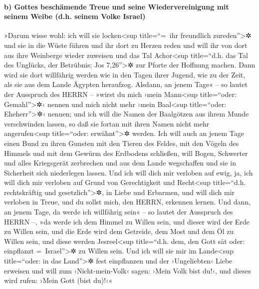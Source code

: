 \hypertarget{b-gottes-beschuxe4mende-treue-und-seine-wiedervereinigung-mit-seinem-weibe-d.h.-seinem-volke-israel}{%
\paragraph{b) Gottes beschämende Treue und seine Wiedervereinigung mit
seinem Weibe (d.h. seinem Volke
Israel)}\label{b-gottes-beschuxe4mende-treue-und-seine-wiedervereinigung-mit-seinem-weibe-d.h.-seinem-volke-israel}}

 »Darum wisse wohl: ich will sie locken\textless sup
title=``=~ihr freundlich zureden''\textgreater✲ und sie in die Wüste
führen und ihr dort zu Herzen reden  und will ihr von
dort aus ihre Weinberge wieder zuweisen und das Tal Achor\textless sup
title=``d.h. das Tal des Unglücks, der Betrübnis; Jos
7,26''\textgreater✲ zur Pforte der Hoffnung machen. Dann wird sie dort
willfährig werden wie in den Tagen ihrer Jugend, wie zu der Zeit, als
sie aus dem Lande Ägypten heraufzog.  Alsdann, an jenem
Tage« -- so lautet der Ausspruch des HERRN -- »wirst du mich ›mein
Mann\textless sup title=``oder: Gemahl''\textgreater✲‹ nennen und mich
nicht mehr ›mein Baal\textless sup title=``oder: Eheherr''\textgreater✲‹
nennen;  und ich will die Namen der Baalgötzen aus ihrem
Munde verschwinden lassen, so daß sie fortan mit ihren Namen nicht mehr
angerufen\textless sup title=``oder: erwähnt''\textgreater✲ werden.
 Ich will auch an jenem Tage einen Bund zu ihren Gunsten
mit den Tieren des Feldes, mit den Vögeln des Himmels und mit dem Gewürm
des Erdbodens schließen, will Bogen, Schwerter und alles Kriegsgerät
zerbrechen und aus dem Lande wegschaffen und sie in Sicherheit sich
niederlegen lassen.  Und ich will dich mir verloben auf
ewig, ja, ich will dich mir verloben auf Grund von Gerechtigkeit und
Recht\textless sup title=``d.h. rechtskräftig und
gesetzlich''\textgreater✲, in Liebe und Erbarmen,  und
will dich mir verloben in Treue, und du sollst mich, den HERRN, erkennen
lernen.  Und dann, an jenem Tage, da werde ich willfährig
sein« -- so lautet der Ausspruch des HERRN --, »da werde ich dem Himmel
zu Willen sein, und dieser wird der Erde zu Willen sein, 
und die Erde wird dem Getreide, dem Most und dem Öl zu Willen sein, und
diese werden Jesreel\textless sup title=``d.h. dem, den Gott sät oder:
einpflanzt =~Israel''\textgreater✲ zu Willen sein.  Und
ich will sie mir im Lande\textless sup title=``oder: in das
Land''\textgreater✲ fest einpflanzen und der ›Ungeliebten‹ Liebe
erweisen und will zum ›Nicht-mein-Volk‹ sagen: ›Mein Volk bist du!‹, und
dieses wird rufen: ›Mein Gott (bist du)!‹«

